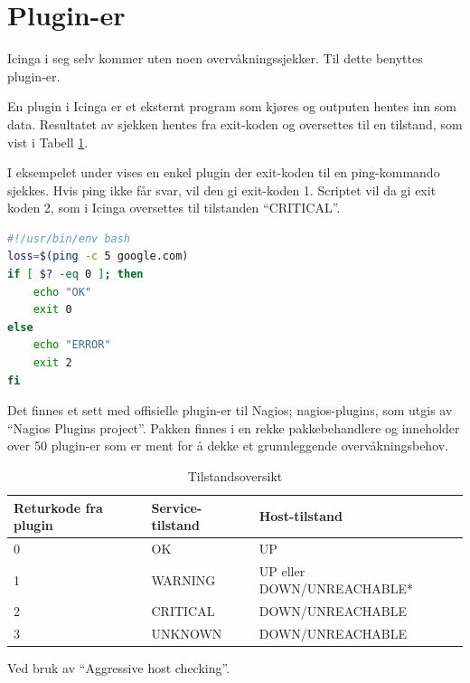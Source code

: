 \clearpage
\section{Plugin-er}
Icinga i seg selv kommer uten noen overvåkningssjekker. Til dette benyttes plugin-er.

En plugin i Icinga er et eksternt program som kjøres og outputen hentes inn som data. Resultatet av sjekken hentes fra exit-koden\cite{wiki:returncode} og oversettes til en tilstand, som vist i Tabell \ref{state}.

I eksempelet under vises en enkel plugin der exit-koden til en ping-kommando sjekkes. Hvis ping ikke får svar, vil den gi exit-koden 1. Scriptet vil da gi exit koden 2, som i Icinga oversettes til tilstanden ``CRITICAL''.
\begin{lstlisting}[language=bash]
#!/usr/bin/env bash
loss=$(ping -c 5 google.com)
if [ $? -eq 0 ]; then
    echo "OK"
    exit 0
else
    echo "ERROR"
    exit 2
fi
\end{lstlisting}

Det finnes et sett med offisielle plugin-er til Nagios; nagios-plugins, som utgis av ``Nagios Plugins project''. Pakken finnes i en rekke pakkebehandlere og inneholder over 50 plugin-er som er ment for å dekke et grunnleggende overvåkningsbehov\cite{nagiosplugins}.

\begin{table}[H]
	\begin{center}
	\begin{threeparttable}
	\begin{tabular}{| l | l | l |} \hline
	\textbf{Returkode fra plugin} & \textbf{Service-tilstand} & \textbf{Host-tilstand} \\ \hline
	0 & OK & UP \\ \hline
	1 & WARNING & UP eller DOWN/UNREACHABLE* \\ \hline
	2 & CRITICAL & DOWN/UNREACHABLE \\ \hline
	3 & UNKNOWN & DOWN/UNREACHABLE \\ \hline
	\end{tabular}
	\begin{tablenotes}
	\small
	\item *Ved bruk av ``Aggressive host checking''\cite{icingapluginapi}.
	\end{tablenotes}
	\caption{Tilstandsoversikt}
	\label{state}
	\end{threeparttable}
	\end{center}
\end{table}

